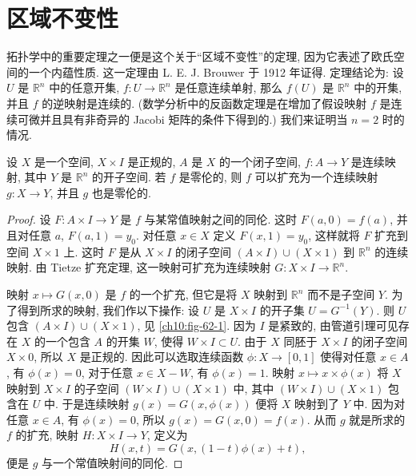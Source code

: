 \section{区域不变性}\label{ch10:section-invariance-of-domain}

拓扑学中的重要定理之一便是这个关于``区域不变性''的定理, 因为它表述了欧氏空间的一个内蕴性质. 这一定理由 L. E. J. Brouwer 于 1912 年证得. 定理结论为: 设 $U$ 是 $\mathbb{R}^{n}$ 中的任意开集, $f\colon U\to\mathbb{R}^{n}$ 是任意连续单射, 那么 $f(U)$ 是 $\mathbb{R}^{n}$ 中的开集, 并且 $f$ 的逆映射是连续的. (数学分析中的反函数定理是在增加了假设映射 $f$ 是连续可微并且具有非奇异的 Jacobi 矩阵的条件下得到的.) 我们来证明当 $n=2$ 时的情况.

\begin{lemma}\label{ch10:lemma-homotopy-extension}
设 $X$ 是一个空间, $X\times I$ 是正规的, $A$ 是 $X$ 的一个闭子空间, $f\colon A\to Y$ 是连续映射, 其中 $Y$ 是 $\mathbb{R}^{n}$ 的开子空间. 若 $f$ 是零伦的, 则 $f$ 可以扩充为一个连续映射 $g\colon X\to Y$, 并且 $g$ 也是零伦的.
\end{lemma}

\begin{proof}
设 $F\colon A\times I\to Y$ 是 $f$ 与某常值映射之间的同伦. 这时 $F(a,0)=f(a)$, 并且对任意 $a$, $F(a,1)=y_{0}$. 对任意 $x\in X$ 定义 $F(x,1)=y_{0}$, 这样就将 $F$ 扩充到空间 $X\times 1$ 上. 这时 $F$ 是从 $X\times I$ 的闭子空间 $(A\times I)\cup(X\times 1)$ 到 $\mathbb{R}^{n}$ 的连续映射. 由 Tietze 扩充定理, 这一映射可扩充为连续映射 $G\colon X\times I\to\mathbb{R}^{n}$.

映射 $x\mapsto G(x,0)$ 是 $f$ 的一个扩充, 但它是将 $X$ 映射到 $\mathbb{R}^{n}$ 而不是子空间 $Y$. 为了得到所求的映射, 我们作以下操作: 设 $U$ 是 $X\times I$ 的开子集 $U=G^{-1}(Y)$. 则 $U$ 包含 $(A\times I)\cup(X\times 1)$, 见 \cref{ch10:fig-62-1}. 因为 $I$ 是紧致的, 由管道引理可见存在 $X$ 的一个包含 $A$ 的开集 $W$, 使得 $W\times I\subset U$. 由于 $X$ 同胚于 $X\times I$ 的闭子空间 $X\times 0$, 所以 $X$ 是正规的. 因此可以选取连续函数 $\phi\colon X\to[0,1]$ 使得对任意 $x\in A$, 有 $\phi(x)=0$, 对于任意 $x\in X-W$, 有 $\phi(x)=1$. 映射 $x\mapsto x\times\phi(x)$ 将 $X$ 映射到 $X\times I$ 的子空间 $(W\times I)\cup(X\times 1)$ 中, 其中 $(W\times I)\cup(X\times 1)$ 包含在 $U$ 中. 于是连续映射 $g(x)=G(x,\phi(x))$ 便将 $X$ 映射到了 $Y$ 中. 因为对任意 $x\in A$, 有 $\phi(x)=0$, 所以 $g(x)=G(x,0)=f(x)$. 从而 $g$ 就是所求的 $f$ 的扩充, 映射 $H\colon X\times I\to Y$, 定义为
\[
H(x,t)=G(x,(1-t)\phi(x)+t),
\]
便是 $g$ 与一个常值映射间的同伦.
\end{proof}

